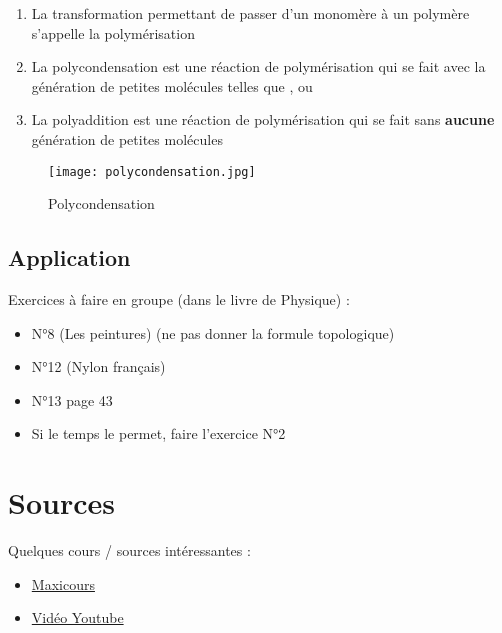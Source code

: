 \documentclass{article}
\begin{document}
\begin{tcolorbox}[colback=blue!10!white, colframe=blue!75!black, title=A connaître par coeur]

\begin{enumerate}[noitemsep]
  \item La transformation permettant de passer d'un monomère à un polymère s'appelle la polymérisation
  \item La polycondensation est une réaction de polymérisation qui se fait avec la génération de petites molécules telles que ,  ou 
  \item La polyaddition est une réaction de polymérisation qui se fait sans \textbf{aucune} génération de petites molécules
\end{enumerate}


\begin{figure}[H]
  \centering
  \texttt{[image: polycondensation.jpg]}
  \caption{\label{} Polycondensation}
\end{figure}

\end{tcolorbox}



\subsection{Application}

\begin{tcolorbox}[colback=blue!10!white, colframe=blue!75!black, title=Application : Structure électronique]
  Exercices à faire en groupe (dans le livre de Physique) : 
  \begin{itemize}[noitemsep]
    \item N°8 (Les peintures) (ne pas donner la formule topologique)
    \item N°12 (Nylon français)
    \item N°13 page 43
    \item Si le temps le permet, faire l'exercice N°2
  \end{itemize}
\end{tcolorbox}



\section{Sources}

Quelques cours / sources intéressantes : 

\begin{itemize}[noitemsep]
  \item \href{https://www.maxicours.com/se/cours/etablir-le-schema-de-lewis-et-la-geometrie-d-une-molecule/}{Maxicours}
  \item \href{https://www.youtube.com/watch?v=bmV-Tbv2Me8&ab_channel=e-profs-PhysiqueChimie}{Vidéo Youtube}
\end{itemize}
\end{document}
